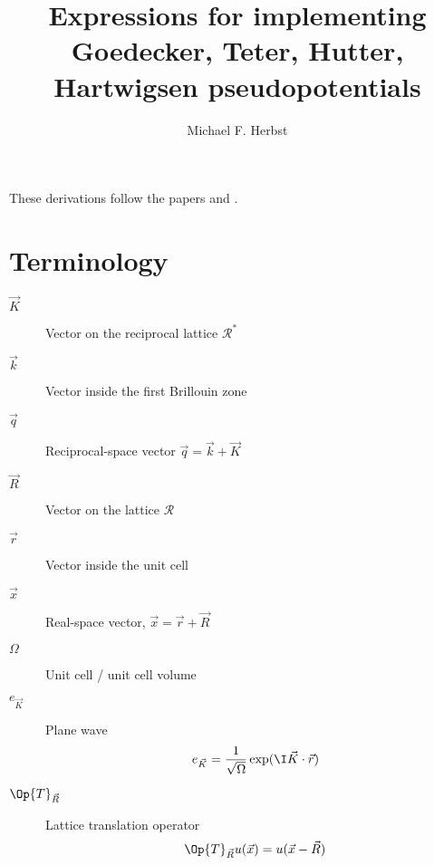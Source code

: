 \documentclass{MFHarticle}
\begin{document}
\title{Expressions for implementing Goedecker, Teter, Hutter,
Hartwigsen pseudopotentials}
\author{Michael F. Herbst}
\maketitle

These derivations follow the papers \citet{Goedecker1996}
and \citet{Hartwigsen1998}.

\section{Terminology}
\begin{description}
	\item[$\vec{K}$] Vector on the reciprocal lattice $\mathcal{R}^\ast$
	\item[$\vec{k}$] Vector inside the first Brillouin zone
	\item[$\vec{q}$] Reciprocal-space vector $\vec{q} = \vec{k} + \vec{K}$
	\item[$\vec{R}$] Vector on the lattice $\mathcal{R}$
	\item[$\vec{r}$] Vector inside the unit cell
	\item[$\vec{x}$] Real-space vector, $\vec{x} = \vec{r} + \vec{R}$
	\item[$\Omega$] Unit cell / unit cell volume
	\item[$e_{\vec{K}}$] Plane wave
		\[ e_{\vec{K}} = \frac1{\sqrt{\Omega}} \exp(\I \vec{K} \cdot \vec{r})\]
	\item[$\Op{T}_{\vec{R}}$] Lattice translation operator
		\[ \Op{T}_{\vec{R}} u(\vec{x}) = u(\vec{x} - \vec{R}) \]
\end{description}
\end{document}
